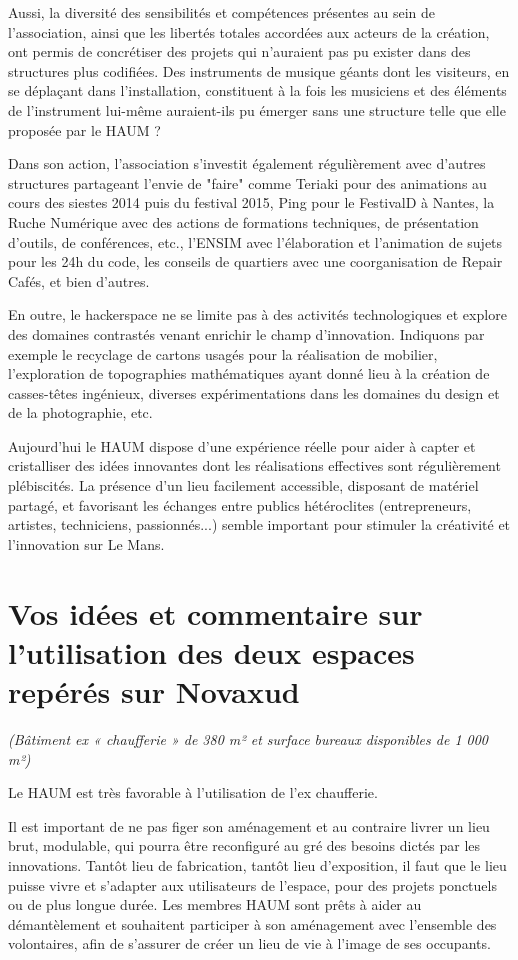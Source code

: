\documentclass[a4paper,10pt]{scrartcl}
\begin{document}
Aussi, la diversité des sensibilités et compétences présentes au sein de l'association, ainsi que les libertés totales accordées aux acteurs de la création, ont permis de concrétiser des projets qui n'auraient pas pu exister dans des structures plus codifiées. Des instruments de musique géants dont les visiteurs, en se déplaçant dans l’installation, constituent à la fois les musiciens et des éléments de l'instrument lui-même auraient-ils pu émerger sans une structure telle que elle proposée par le HAUM ?

Dans son action, l'association s'investit également régulièrement avec d'autres structures partageant l'envie de "faire" comme Teriaki pour des animations au cours des siestes 2014 puis du festival 2015, Ping pour le FestivalD à Nantes, la Ruche Numérique avec des actions de formations techniques, de présentation d'outils, de conférences, etc., l'ENSIM avec l'élaboration et l'animation de sujets pour les 24h du code, les conseils de quartiers avec une coorganisation de Repair Cafés, et bien d'autres.

En outre, le hackerspace ne se limite pas à des activités technologiques et explore des domaines contrastés venant enrichir le champ d'innovation. Indiquons par exemple le recyclage de cartons usagés pour la réalisation de mobilier, l'exploration de topographies mathématiques ayant donné lieu à la création de casses-têtes ingénieux, diverses expérimentations dans les domaines du design et de la photographie, etc.

Aujourd'hui le HAUM dispose d'une expérience réelle pour aider à capter et cristalliser des idées innovantes dont les réalisations effectives sont régulièrement plébiscités. La présence d'un lieu facilement accessible, disposant de matériel partagé, et favorisant les échanges entre publics hétéroclites (entrepreneurs, artistes, techniciens, passionnés...) semble important pour stimuler la créativité et l'innovation sur Le Mans. 

\section{Vos idées et commentaire sur l’utilisation des deux espaces repérés sur Novaxud}
\emph{(Bâtiment ex « chaufferie » de 380 m² et surface bureaux disponibles de 1 000 m²)}

Le HAUM est très favorable à l'utilisation de l'ex chaufferie.

Il est important de ne pas figer son aménagement et au contraire livrer un lieu brut, modulable, qui pourra être reconfiguré au gré des besoins dictés par les innovations. Tantôt lieu de fabrication, tantôt lieu d'exposition, il faut que le lieu puisse vivre et s'adapter aux utilisateurs de l'espace, pour des projets ponctuels ou de plus longue durée. Les membres HAUM sont prêts à aider au démantèlement et souhaitent participer à son aménagement avec l'ensemble des volontaires, afin de s'assurer de créer un lieu de vie à l'image de ses occupants.
\end{document}

